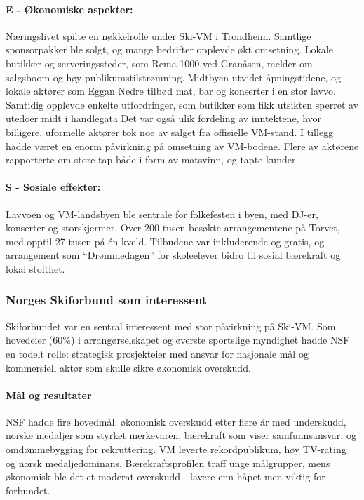 \paragraph{E - Økonomiske aspekter:}
Næringslivet spilte en nøkkelrolle under Ski-VM i Trondheim. Samtlige sponsorpakker ble solgt, og mange bedrifter opplevde økt omsetning\parencite{kom24Sponsorsalg}. Lokale butikker og serveringssteder, som Rema 1000 ved Granåsen, melder om salgsboom og høy publikumstilstrømning\parencite{nettavisenRema}. Midtbyen utvidet åpningstidene, og lokale aktører som Eggan Nedre tilbød mat, bar og konserter i en stor lavvo\parencite{midtbyenProgram}. Samtidig opplevde enkelte utfordringer, som butikker som fikk utsikten sperret av utedoer midt i handlegata\parencite{nettavisenToalett} Det var også ulik fordeling av inntektene, hvor billigere, uformelle aktører tok noe av salget fra offisielle VM-stand\parencite{nettavisenRema}. I tillegg hadde været en enorm påvirkning på omsetning av VM-bodene. Flere av aktørene rapporterte om store tap både i form av matsvinn, og tapte kunder\parencite{innherredTragedie}.

\paragraph{S - Sosiale effekter:}
Lavvoen og VM-landsbyen ble sentrale for folkefesten i byen, med DJ-er, konserter og 
storskjermer. Over 200 tusen besøkte arrangementene på Torvet, med opptil 27 tusen på én kveld\parencite{wikipediaSkiVM}. Tilbudene var inkluderende og gratis, og arrangement som “Drømmedagen” for skoleelever bidro til sosial bærekraft og lokal stolthet\parencite{wikipediaSkiVM}.

\subsubsection{Norges Skiforbund som interessent}
Skiforbundet var en sentral interessent med stor påvirkning på Ski-VM. Som hovedeier (60\%) i arrangørselskapet og øverste sportslige myndighet hadde NSF en todelt rolle: strategisk prosjekteier med ansvar for nasjonale mål og kommersiell aktør som skulle sikre økonomisk overskudd\parencite{ProffSkiVM2025}.

\paragraph{Mål og resultater}
NSF hadde fire hovedmål: økonomisk overskudd etter flere år med underskudd\parencite{Adresseavisen}, norske medaljer som styrket merkevaren, bærekraft som viser samfunnsansvar\parencite{TrondheimKommuneVM}, og omdømmebygging for rekruttering\parencite{OsloVM}. VM leverte rekordpublikum, høy TV-rating og norsk medaljedominans. Bærekraftsprofilen traff unge målgrupper, mens økonomisk ble det et moderat overskudd - lavere enn håpet men viktig for forbundet\parencite{Trondheim2025Portal,Adresseavisen}.

